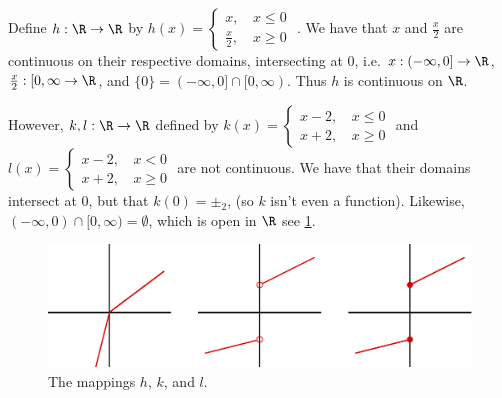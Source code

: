\begin{example}
        Define $h:\R \rightarrow \R$ by $h(x)=
            \begin{cases}
                x \text{, } & x \leq 0 \\
                \frac{x}{2} \text{, } & x \geq 0
            \end{cases}$
        . We have that $x$ and  $\frac{x}{2}$ are continuous on their respective domains,
        intersecting at $0$, i.e.  $x:(-\infty,0] \rightarrow \R$, $ \frac{x}{2}:[0,\infty
        \rightarrow \R$, and $\{0\}=(-\infty, 0] \cap [0, \infty)$. Thus $h$ is continuous on $\R$.


        However, $k,l:\R \rightarrow \R$ defined by $k(x)=
            \begin{cases}
                x-2 \text{, } & x \leq 0 \\
                x+2 \text{, } & x \geq 0
            \end{cases}$
            and $l(x)=
            \begin{cases}
                x-2 \text{, } & x < 0 \\
                x+2 \text{, } & x \geq 0
            \end{cases}$
            are not continuous. We have that their domains intersect at $0$, but that  $k(0)=\pm_2$,
            (so $k$ isn't even a function). Likewise, $(-\infty,0) \cap [0,\infty)=\emptyset$, which
            is open in $\R$ see \ref{fig_1.9}.

            \begin{figure}[h]
                \centering
                \includegraphics[scale = 0.5]{Figures/Chapter1/pasting_lemma.eps}
                \caption{The mappings $h$, $k$, and  $l$.}
                \label{fig_1.9}
            \end{figure}
\end{example}

